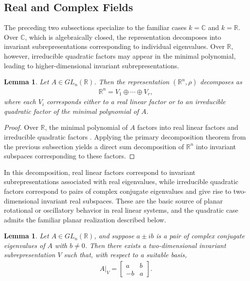 \documentclass[letterpaper, 9pt, conference]{ieeeconf}
\newtheorem{lemma}[theorem]{Lemma}
\begin{document}
\subsection{Real and Complex Fields}

The preceding two subsections specialize to the familiar cases
$k=\mathbb{C}$ and $k=\mathbb{R}$. Over $\mathbb{C}$, which is algebraically
closed, the representation decomposes into invariant subrepresentations
corresponding to individual eigenvalues. Over $\mathbb{R}$, however, irreducible
quadratic factors may appear in the minimal polynomial, leading to
higher-dimensional invariant subrepresentations.

\begin{lemma}
Let $A \in GL_n(\mathbb{R})$. Then the representation $(\mathbb{R}^n,\rho)$
decomposes as
\begin{eqnarray}
\mathbb{R}^n = V_1 \oplus \cdots \oplus V_r,
\end{eqnarray}
where each $V_i$ corresponds either to a real linear factor or to an
irreducible quadratic factor of the minimal polynomial of $A$.
\end{lemma}

\begin{proof}
Over $\mathbb{R}$, the minimal polynomial of $A$ factors into real linear
factors and irreducible quadratic factors \cite{lang_algebra_book}. Applying
the primary decomposition theorem from the previous subsection yields a direct
sum decomposition of $\mathbb{R}^n$ into invariant subspaces corresponding to
these factors.
\end{proof}

In this decomposition, real linear factors correspond to invariant
subrepresentations associated with real eigenvalues, while irreducible quadratic
factors correspond to pairs of complex conjugate eigenvalues and give rise to
two-dimensional invariant real subspaces. These are the basic source of planar
rotational or oscillatory behavior in real linear systems, and the quadratic
case admits the familiar planar realization described below.

\begin{lemma}
Let $A \in GL_n(\mathbb{R})$, and suppose $a \pm ib$ is a pair of complex
conjugate eigenvalues of $A$ with $b \neq 0$. Then there exists a
two-dimensional invariant subrepresentation $V$ such that, with respect to a
suitable basis,
\begin{eqnarray}
A|_V =
\begin{bmatrix}
a & b \\
-b & a
\end{bmatrix}.
\end{eqnarray}
\end{lemma}
\end{document}
